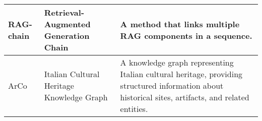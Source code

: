 \begin{tabularx}{\textwidth}{
  >{\raggedright\arraybackslash}p{2.5cm}
  >{\raggedright\arraybackslash}p{4cm}
  >{\noindent\justifying\arraybackslash}X
}
\cmidrule(lr){1-3}
RAG-chain & Retrieval-Augmented Generation Chain & A method that links multiple RAG components in a sequence. \\
\cmidrule(lr){1-3}
ArCo & Italian Cultural Heritage Knowledge Graph & A knowledge graph representing Italian cultural heritage, providing structured information about historical sites, artifacts, and related entities. \\
\bottomrule
\end{tabularx}
